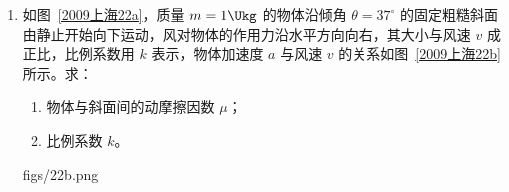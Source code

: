 \documentclass[\gkver]{gaokaozhenti}
\begin{document}
\begin{enumerate}
{\onepicture[align=right, h=5.51cm]{}

（2）插入水银槽后左管压强为
$p' = p + \rho g\Delta h = 80\UcmHg$，
左管内外水银面高度差为
$h_{1} = \frac{p' - p_{0}}{\rho g} = 4\Ucm$，
中、左管内气体，由等温变化得
$p_{0}l = p'l'$
解得 $l' = 38\Ucm$，
左管插入水银槽深度为
$h = l + \frac{\Delta h}{2} - l' + h_{1} = 7\Ucm$。
}

\item
如图~\ref{2009上海22a}，质量 $m = 1\Ukg$ 的物体沿倾角 $\theta = 37^{\circ}$ 的固定粗糙斜面由静止开始向下运动，风对物体的作用力沿水平方向向右，其大小与风速 $v$ 成正比，比例系数用 $k$ 表示，物体加速度 $a$ 与风速 $v$ 的关系如图~\ref{2009上海22b} 所示。求：
\begin{enumerate}
	\item
	物体与斜面间的动摩擦因数 $\mu$；
	\item
	比例系数 $k$。
\end{enumerate}
{figs/22b.png}


\end{enumerate}
\end{document}
